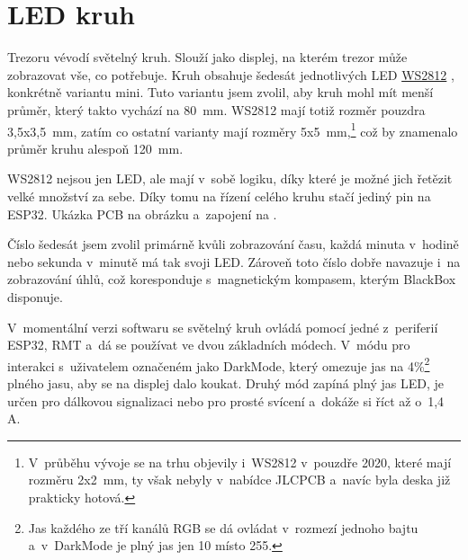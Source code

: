 \section{LED kruh}
\label{WS2812}

Trezoru vévodí světelný kruh. Slouží jako displej, na kterém trezor může zobrazovat vše, co potřebuje. Kruh obsahuje šedesát jednotlivých LED 
\href{https://cdn-shop.adafruit.com/datasheets/WS2812B.pdf}{WS2812} \parencite{WS2812}, konkrétně variantu mini. Tuto variantu jsem zvolil,
 aby kruh mohl mít menší
průměr, který takto vychází na 80~mm. WS2812 mají totiž rozměr pouzdra 3,5x3,5~mm, zatím co ostatní varianty mají rozměry 
5x5~mm,\footnote{V~průběhu vývoje se na trhu 
objevily i~WS2812 v~pouzdře 2020, které mají rozměru 2x2~mm, ty však nebyly v~nabídce JLCPCB a~navíc byla deska již prakticky hotová.} 
což by znamenalo průměr kruhu alespoň 120~mm.

WS2812 nejsou jen LED, ale mají v~sobě logiku, díky které je možné jich řetězit velké množství za sebe.
Díky tomu na řízení celého kruhu stačí jediný pin na ESP32. %
Ukázka PCB na obrázku  a~zapojení na .

Číslo šedesát jsem zvolil primárně kvůli zobrazování času, každá minuta v~hodině nebo sekunda v~minutě má tak svoji LED.
Zároveň toto číslo dobře navazuje i~na zobrazování úhlů, což koresponduje s~magnetickým kompasem, kterým BlackBox disponuje.

V~momentální verzi softwaru se světelný kruh ovládá pomocí jedné z~periferií ESP32, RMT a~dá se používat ve dvou základních módech. 
V~módu pro interakci s~uživatelem označeném jako DarkMode, který omezuje jas na 4\%\footnote{Jas každého ze tří kanálů RGB 
se dá ovládat v~rozmezí jednoho bajtu a~v~DarkMode je plný jas jen 10 místo 255.} plného jasu, aby se na displej dalo koukat. 
Druhý mód zapíná plný jas LED, je určen pro dálkovou signalizaci nebo pro prosté svícení a~dokáže si říct až o~1,4 A.
